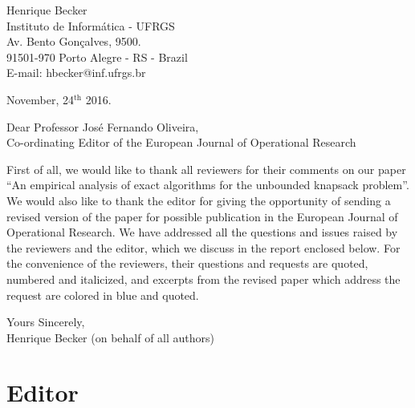 \documentclass{elsarticle}
\begin{document}
\pagestyle{empty}

\vspace{2cm}

\begin{flushright}
   \begin{minipage}{7cm}
      Henrique Becker \\
      Instituto de Informática - UFRGS \\
      Av. Bento Gonçalves, 9500. \\
      91501-970 Porto Alegre - RS - Brazil \\
      E-mail: hbecker@inf.ufrgs.br \\
   \end{minipage}
\end{flushright}

\begin{flushleft}
November, 24$^{\text{th}}$ 2016.

\vspace{1.5cm}

Dear Professor José Fernando Oliveira, \\
Co-ordinating Editor of the European Journal of Operational Research
\end{flushleft}

\bigskip
First of all, we would like to thank all reviewers for their comments on our paper ``An empirical analysis of exact algorithms for the unbounded knapsack problem''.
We would also like to thank the editor for giving the opportunity of sending a revised version of the paper for possible publication in the European Journal of Operational Research.
We have addressed all the questions and issues raised by the reviewers and the editor, which we discuss in the report enclosed below.
For the convenience of the reviewers, their questions and requests are quoted, numbered and italicized, and excerpts from the revised paper which address the request are colored in blue and quoted.

\bigskip

\begin{flushleft}
Yours Sincerely,\\
Henrique Becker (on behalf of all authors)
\end{flushleft}

\newpage

\section{Editor}
\end{document}
